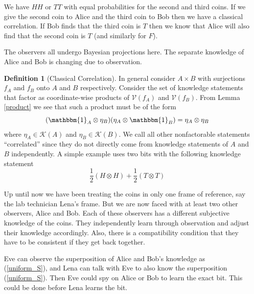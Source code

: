 \documentclass[12pt,a4paper]{article}
\theoremstyle{myrule}
\theoremstyle{postulate}
\theoremstyle{definition}
\newtheorem{definition}{Definition}[section]
\begin{document}
We have $HH$ or $TT$ with equal probabilities for the second and third coins.  If we give the second coin to Alice and the third coin to Bob then we have a classical correlation.  If Bob finds that the third coin is $T$ then we know that Alice will also find that the second coin is $T$ (and similarly for $F$).


The observers all undergo Bayesian projections here. The separate knowledge of Alice and Bob is changing due to observation.

\begin{definition}[Classical Correlation]
\label{corrdef}
In general consider $A \times B$ with surjections $f_A$ and $f_B$ onto $A$ and $B$ respectively.  Consider the set of knowledge statements that factor as coordinate-wise products of $\mathcal{V}(f_A)$ and $\mathcal{V}(f_B)$.  From Lemma \ref{product} we see that such a product must be of the form
\[
(\mathbbm{1}_A \otimes \eta_B) (\eta_A \otimes \mathbbm{1}_B) = \eta_A \otimes \eta_B
\]
where $\eta_A \in \mathcal{K}(A)$ and $\eta_B \in \mathcal{K}(B)$.  We call all other nonfactorable statements ``correlated'' since they do not directly come from knowledge statements of $A$ and $B$ independently.  A simple example uses two bits with the following knowledge statement
\begin{equation}
\label{classiccorr}
  \frac{1}{2} (H \otimes H) + \frac{1}{2} (T \otimes T) 
\end{equation}

\end{definition}

Up until now we have been treating the coins in only one frame of reference, say the lab technician Lena's frame.  But we are now faced with at least two other observers, Alice and Bob.  Each of these observers has a different subjective knowledge of the coins.  They independently learn through observation and adjust their knowledge accordingly.  Also, there is a compatibility condition that they have to be consistent if they get back together.

Eve can observe the superposition of Alice and Bob's knowledge as (\ref{uniform_S}), and Lena can talk with Eve to also know the superposition (\ref{uniform_S}).  Then Eve could spy on Alice or Bob to learn the exact bit.  This could be done before Lena learns the bit.
\end{document}
